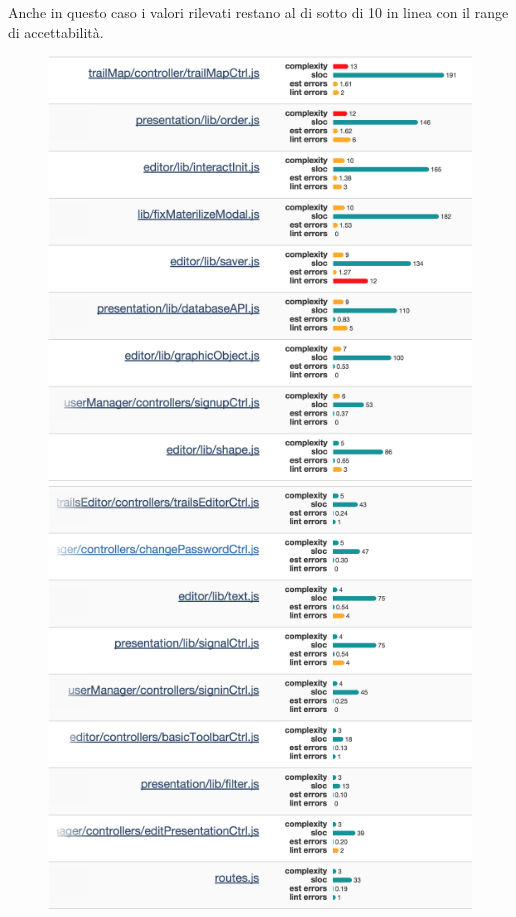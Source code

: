 Anche in questo caso i valori rilevati restano al di sotto di 10 in linea con il range di accettabilità.

\begin{figure}[h!]
	\centering
	\includegraphics[scale=.45]{img/lint1.png}
	\centering
	\includegraphics[scale=.45]{img/lint2.png}
\end{figure} 

